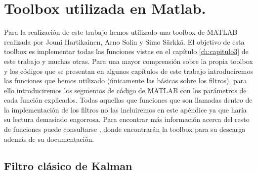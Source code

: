 \pagestyle{scrheadings}
\ihead[]{\rightmark}
\ofoot[]{\thepage{}}
\chapter{Toolbox utilizada en Matlab.}\label{ApendiceB}
Para la realización de este trabajo hemos utilizado una toolbox de MATLAB realizada por Jouni Hartikainen, Arno Solin y Simo Särkkä.
El objetivo de esta toolbox es implementar todas las funciones vistas en el capítulo \ref{ch:capitulo3} de este trabajo y muchas otras.
Para una mayor comprensión sobre la propia toolbox y los códigos que se presentan en algunos capítulos de este trabajo introduciremos las funciones que hemos utilizado (únicamente las básicas sobre los filtros), para ello introduciremos los segmentos de código de MATLAB con los parámetros de cada función explicados.
Todas aquellas que funciones que son llamadas dentro de la implementación de los filtros no las incluiremos en este apéndice ya que haría su lectura demasiado engorrosa.
Para encontrar más información acerca del resto de funciones puede consultarse \cite{toolbox_simo}, donde encontrarán la toolbox para su descarga además de su documentación.

\section{Filtro clásico de Kalman}
